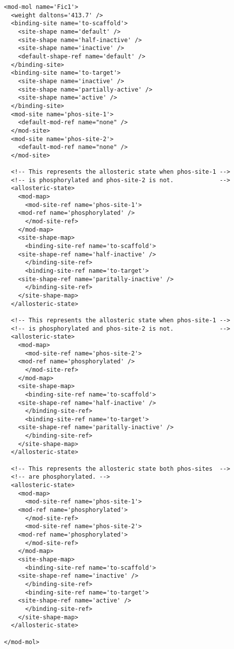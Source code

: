 \lstset{language=XML}
\begin{lstlisting}[caption=A complete mod-mol example, label=completemodmolexample]
<mod-mol name='Fic1'>
  <weight daltons='413.7' />
  <binding-site name='to-scaffold'>
    <site-shape name='default' />
    <site-shape name='half-inactive' />
    <site-shape name='inactive' />
    <default-shape-ref name='default' />
  </binding-site>
  <binding-site name='to-target'>
    <site-shape name='inactive' />
    <site-shape name='partially-active' />
    <site-shape name='active' />
  </binding-site>
  <mod-site name='phos-site-1'>
    <default-mod-ref name="none" />
  </mod-site>
  <mod-site name='phos-site-2'>
    <default-mod-ref name="none" />
  </mod-site>

  <!-- This represents the allosteric state when phos-site-1 -->
  <!-- is phosphorylated and phos-site-2 is not.             -->
  <allosteric-state>
    <mod-map>
      <mod-site-ref name='phos-site-1'>
	<mod-ref name='phosphorylated' />
      </mod-site-ref>
    </mod-map>
    <site-shape-map>
      <binding-site-ref name='to-scaffold'>
	<site-shape-ref name='half-inactive' />
      </binding-site-ref>
      <binding-site-ref name='to-target'>
	<site-shape-ref name='paritally-inactive' />
      </binding-site-ref>
    </site-shape-map>
  </allosteric-state>

  <!-- This represents the allosteric state when phos-site-1 -->
  <!-- is phosphorylated and phos-site-2 is not.             -->
  <allosteric-state>
    <mod-map>
      <mod-site-ref name='phos-site-2'>
	<mod-ref name='phosphorylated' />
      </mod-site-ref>
    </mod-map>
    <site-shape-map>
      <binding-site-ref name='to-scaffold'>
	<site-shape-ref name='half-inactive' />
      </binding-site-ref>
      <binding-site-ref name='to-target'>
	<site-shape-ref name='paritally-inactive' />
      </binding-site-ref>
    </site-shape-map>
  </allosteric-state>

  <!-- This represents the allosteric state both phos-sites  -->
  <!-- are phosphorylated. -->
  <allosteric-state>
    <mod-map>
      <mod-site-ref name='phos-site-1'>
	<mod-ref name='phosphorylated'>
      </mod-site-ref>
      <mod-site-ref name='phos-site-2'>
	<mod-ref name='phosphorylated'>
      </mod-site-ref>
    </mod-map>
    <site-shape-map>
      <binding-site-ref name='to-scaffold'>
	<site-shape-ref name='inactive' />
      </binding-site-ref>
      <binding-site-ref name='to-target'>
	<site-shape-ref name='active' />
      </binding-site-ref>
    </site-shape-map>
  </allosteric-state>
  
</mod-mol>
\end{lstlisting}

